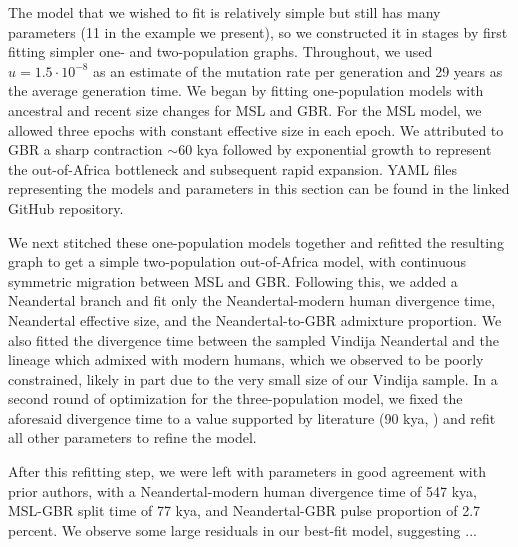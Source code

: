 \documentclass[]{article}
\begin{document}
The model that we wished to fit is relatively simple but still has many parameters (11 in the example we present), so we constructed it in stages by first fitting simpler one- and two-population graphs.
Throughout, we used $u=1.5\cdot 10^{-8}$ as an estimate of the mutation rate per generation and 29 years as the average generation time.
We began by fitting one-population models with ancestral and recent size changes for MSL and GBR.
For the MSL model, we allowed three epochs with constant effective size in each epoch.
We attributed to GBR a sharp contraction $\sim$60 kya followed by exponential growth to represent the out-of-Africa bottleneck and subsequent rapid expansion. YAML files representing the models and parameters in this section can be found in the linked GitHub repository.

We next stitched these one-population models together and refitted the resulting graph to get a simple two-population out-of-Africa model, with continuous symmetric migration between MSL and GBR. 
Following this, we added a Neandertal branch and fit only the Neandertal-modern human divergence time, Neandertal effective size, and the Neandertal-to-GBR admixture proportion. 
We also fitted the divergence time between the sampled Vindija Neandertal and the lineage which admixed with modern humans, which we observed to be poorly constrained, likely in part due to the very small size of our Vindija sample.
In a second round of optimization for the three-population model, we fixed the aforesaid divergence time to a value supported by literature (90 kya, \cite{prufer2017high}) and refit all other parameters to refine the model.

After this refitting step, we were left with parameters in good agreement with prior authors, with a Neandertal-modern human divergence time of 547 kya, MSL-GBR split time of 77 kya, and Neandertal-GBR pulse proportion of 2.7 percent. 
We observe some large residuals in our best-fit model, suggesting ...
\end{document}
